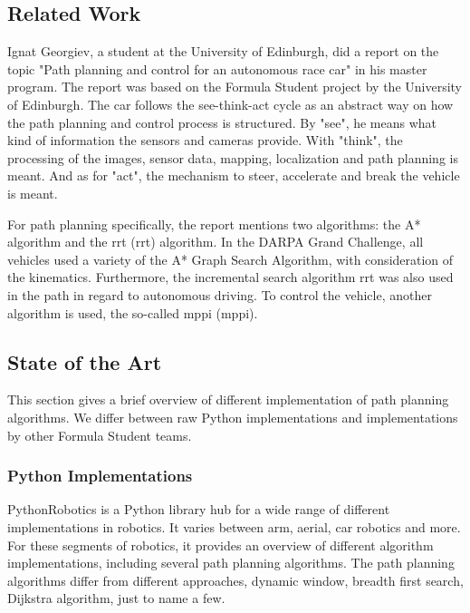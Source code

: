 \subsection{Related Work}

Ignat Georgiev, a student at the University of Edinburgh, did a report on the topic "Path planning and control for an autonomous race car" in his master program. The report was based on the Formula Student project by the University of Edinburgh. The car follows the see-think-act cycle as an abstract way on how the path planning and control process is structured. By "see", he means what kind of information the sensors and cameras provide. With "think", the processing of the images, sensor data, mapping, localization and path planning is meant. And as for "act", the mechanism to steer, accelerate and break the vehicle is meant.

For path planning specifically, the report mentions two algorithms: the A* algorithm and the \acrlong{rrt} (\acrshort{rrt}) algorithm. In the DARPA Grand Challenge, all vehicles used a variety of the A* Graph Search Algorithm, with consideration of the kinematics. Furthermore, the incremental search algorithm \acrshort{rrt} was also used in the path in regard to autonomous driving.
To control the vehicle, another algorithm is used, the so-called \acrlong{mppi} (\acrshort{mppi}).
\cite{path_planning_and_control_georgiev}

\subsection{State of the Art}
This section gives a brief overview of different implementation of path planning algorithms. We differ between raw Python implementations and implementations by other Formula Student teams.

\subsubsection{Python Implementations}
PythonRobotics is a Python library hub for a wide range of different implementations in robotics. It varies between arm, aerial, car robotics and more.
For these segments of robotics, it provides an overview of different algorithm implementations, including several path planning algorithms.
The path planning algorithms differ from different approaches, dynamic window, breadth first search, Dijkstra algorithm, just to name a few. 
\cite{python_robotics}


